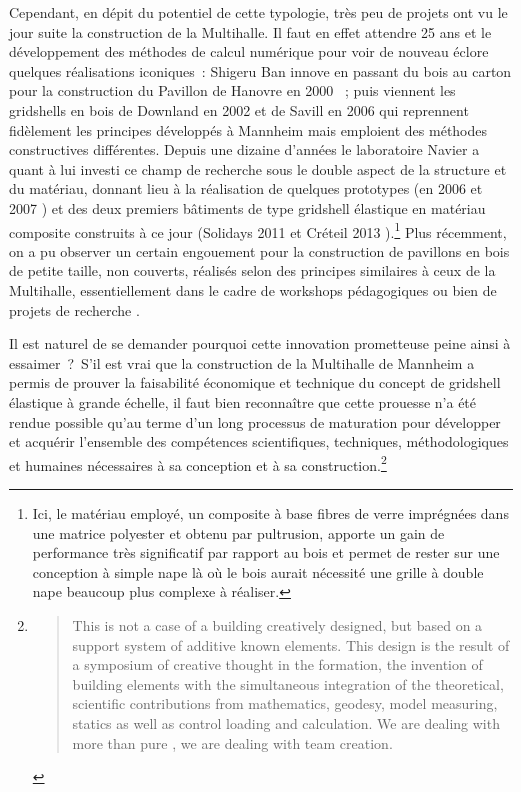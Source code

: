 Cependant, en dépit du potentiel de cette typologie, très peu de projets ont vu le jour suite la construction de la Multihalle. Il faut en effet attendre 25 ans et le développement des méthodes de calcul numérique pour voir de nouveau éclore quelques réalisations iconiques~: Shigeru Ban innove en passant du bois au carton pour la construction du Pavillon de Hanovre en 2000 \cite{Ban2006}~; puis viennent les gridshells en bois de Downland en 2002 \cite{Harris2002} et de Savill en 2006 \cite{Harris2008} qui reprennent fidèlement les principes développés à Mannheim mais emploient des méthodes constructives différentes. Depuis une dizaine d'années le laboratoire Navier a quant à lui investi ce champ de recherche sous le double aspect de la structure et du matériau, donnant lieu à la réalisation de quelques prototypes (en 2006 et 2007 \cite{Douthe2006,Douthe2010a}) et des deux premiers bâtiments de type gridshell élastique en matériau composite construits à ce jour (Solidays 2011 \cite{Baverel2012} et Créteil 2013 \cite{DuPeloux2016}).\footnote{Ici, le matériau employé, un composite à base fibres de verre imprégnées dans une matrice polyester et obtenu par pultrusion, apporte un gain de performance très significatif par rapport au bois et permet de rester sur une conception à simple nape là où le bois aurait nécessité une grille à double nape beaucoup plus complexe à réaliser.} Plus récemment, on a pu observer un certain engouement pour la construction de pavillons en bois de petite taille, non couverts, réalisés selon des principes similaires à ceux de la Multihalle, essentiellement dans le cadre de workshops pédagogiques ou bien de projets de recherche \cite{DAmico2014,Naicu2014,DAmico2015a,Mork2016}.

Il est naturel de se demander pourquoi cette innovation prometteuse peine ainsi à essaimer~?~S'il est vrai que la construction de la Multihalle de Mannheim a permis de prouver la faisabilité économique et technique du concept de gridshell élastique à grande échelle, il faut bien reconnaître que cette prouesse n'a été rendue possible qu'au terme d'un long processus de maturation pour développer et acquérir l'ensemble des compétences scientifiques, techniques, méthodologiques et humaines nécessaires à sa conception et à sa construction.\footnote{\blockcquote[Georg Lewenton][p.~201]{IL13}{This is not a case of a building creatively designed, but based on a support system of additive known elements. This design is the result of a symposium of creative thought in the formation, the invention of building elements with the simultaneous integration of the theoretical, scientific contributions from mathematics, geodesy, model measuring, statics as well as control loading and calculation. We are dealing with more than pure , we are dealing with team creation.}}

